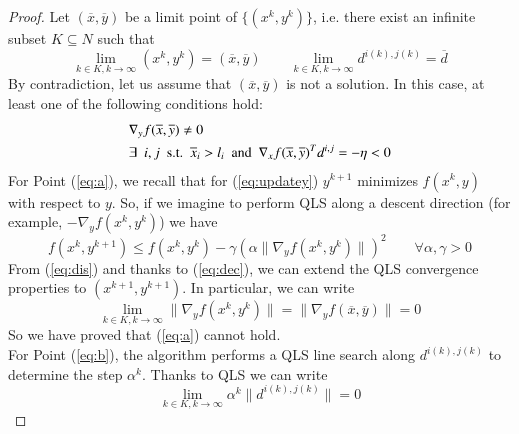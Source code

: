 \begin{proof}
Let $(\overline{x},\overline{y})$ be a limit point of $\{(x^k, y^k)\}$, i.e. there exist an infinite subset $K \subseteq N$ such that
\begin{equation}\label{eq:asim}
\lim_{k \in K, k \rightarrow \infty} (x^k, y^k) = (\overline{x},\overline{y}) \qquad \lim_{k \in K, k \rightarrow \infty} d^{i(k),j(k)} = \overline{d}
\end{equation}
By contradiction, let us assume that $(\overline{x},\overline{y})$ is not a solution. In this case, at least one of the following conditions hold:
\begin{subequations}
\begin{align}
&\nabla_y f(\overline{x},\overline{y}) \neq 0  \label{eq:a}\\
&\exists \enskip i, j \enskip  \text{s.t.} \enskip \overline{x}_i > l_i \enskip  \text{and} \enskip  \nabla_x f(\overline{x},\overline{y})^T d^{i,j} = -\eta < 0 \label{eq:b}
\end{align}
\end{subequations}
For Point (\ref{eq:a}), we recall that for (\ref{eq:updatey}) $y^{k+1}$ minimizes $f(x^{k},y)$ with respect to $y$. So, if we imagine to perform QLS along a descent direction (for example, $-\nabla_y f(x^{k},y^{k})$) we have
\begin{equation}\label{eq:dis}
f(x^{k}, y^{k+1}) \leq f(x^{k}, y^{k}) - \gamma (\alpha \parallel \nabla_y f(x^{k}, y^{k}) \parallel) ^2 \qquad \forall \alpha, \gamma > 0
\end{equation}
From (\ref{eq:dis}) and thanks to (\ref{eq:dec}), we can extend the QLS convergence properties to $(x^{k+1}, y^{k+1})$. In particular, we can write
\begin{equation}
\lim_{k \in K, k \rightarrow \infty} \parallel \nabla_y f(x^{k}, y^{k}) \parallel =  \parallel \nabla_y f(\overline{x},\overline{y}) \parallel = 0
\end{equation}
So we have proved that (\ref{eq:a}) cannot hold.\\
For Point (\ref{eq:b}), the algorithm performs a QLS line search along $d^{i(k),j(k)}$ to determine the step $\alpha^{k}$. Thanks to QLS we can write
\begin{equation}\label{eq:armijoprop}
\lim_{k \in K, k \rightarrow \infty} \alpha^{k} \parallel d^{i(k),j(k)} \parallel = 0
\end{equation}

\end{proof}
